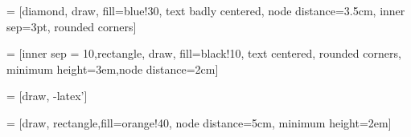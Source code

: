 
\usetikzlibrary{shapes,arrows}

\newcommand{\hoo}[0]{H_2O}

 = [diamond, draw, fill=blue!30, text badly centered, node distance=3.5cm, inner sep=3pt,  rounded corners]
    
 = [inner sep = 10,rectangle, draw, fill=black!10, text centered, rounded corners, minimum height=3em,node distance=2cm]
    
 = [draw, -latex']

 = [draw, rectangle,fill=orange!40, node distance=5cm,
    minimum height=2em]












